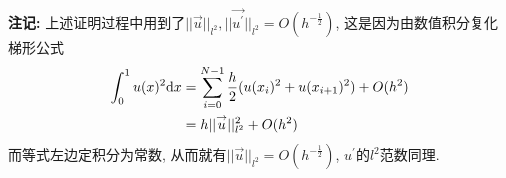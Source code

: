\documentclass[12pt]{article}
\begin{document}
\quad \\
\textbf{注记:} 上述证明过程中用到了$\vert \vert \overset{\rightarrow}{u}\vert \vert_{l^2}, \vert \vert \overset{\rightarrow}{u^{'}}\vert \vert_{l^2}=O(h^{-\frac{1}{2}})$, 这是因为由数值积分复化梯形公式
\begin{align*}
	\int_{0}^{1}u(x)^2 {\rm d}x&=\sum_{i=0}^{N-1}\frac{h}{2}(u(x_i)^2+u(x_{i+1})^2)+O(h^2)\\
	&=h\vert \vert \overset{\rightarrow}{u} \vert \vert^2_{l^2}+O(h^2)
\end{align*}
而等式左边定积分为常数, 从而就有$\vert \vert \overset{\rightarrow}{u} \vert \vert_{l^2}=O(h^{-\frac{1}{2}})$, $u^{'}$的$l^2$范数同理.\\
\quad \\
\end{document}
